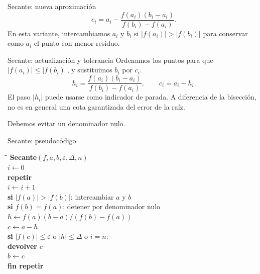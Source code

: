 \documentclass[main.tex]{subfiles}
\begin{document}
\begin{frame}{Secante: nueva aproximación}
\[\boxed{c_i=a_i-\frac{f(a_i)(b_i-a_i)}{f(b_i)-f(a_i)}.}\]En esta variante, intercambiamos $a_i$ y $b_i$ si $|f(a_i)|>|f(b_i)|$ para conservar como $a_i$ el punto con menor residuo.
\end{frame}

\begin{frame}{Secante: actualización y tolerancia}
\small Ordenamos los puntos para que $|f(a_i)|\le|f(b_i)|$, y sustituimos $b_i$ por $c_i$.\[h_i=\frac{f(a_i)(b_i-a_i)}{f(b_i)-f(a_i)},\qquad c_i=a_i-h_i.\]El paso $|h_i|$ puede usarse como indicador de parada. A diferencia de la bisección, no es en general una cota garantizada del error de la raíz.\par\medskip Debemos evitar un denominador nulo.
\end{frame}

\begin{frame}{Secante: pseudocódigo}
\footnotesize\begin{tabbing}\hspace{4mm}\=\hspace{5mm}\=\kill
\textbf{Secante}$(f,a,b,\varepsilon,\Delta,n)$\\
$i\gets0$\\
\textbf{repetir}\\
\>$i\gets i+1$\\
\>\textbf{si} $|f(a)|>|f(b)|$: intercambiar $a$ y $b$\\
\>\textbf{si} $f(b)=f(a)$: detener por denominador nulo\\
\>$h\gets f(a)(b-a)/(f(b)-f(a))$\\
\>$c\gets a-h$\\
\>\textbf{si} $|f(c)|\le\varepsilon$ o $|h|\le\Delta$ o $i=n$:\\
\>\>\textbf{devolver} $c$\\
\>$b\gets c$\\
\textbf{fin repetir}
\end{tabbing}
\end{frame}
\end{document}

